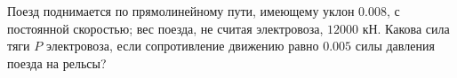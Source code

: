 Поезд поднимается по прямолинейному пути, имеющему уклон $0.008$, с
постоянной скоростью; вес поезда, не считая электровоза, $12000$ кН.
Какова сила тяги $P$ электровоза, если сопротивление движению равно
$0.005$ силы давления поезда на рельсы?
